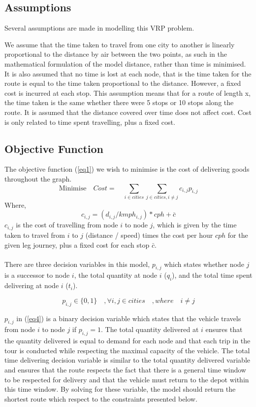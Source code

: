 \documentclass[a4paper,11pt]{article}
\begin{document}
\subsection{Assumptions}
Several assumptions are made in modelling this VRP problem.

We assume that the time taken to travel from one city to another is linearly proportional to the distance by air between the two points, as such in the mathematical formulation of the model distance, rather than time is minimised. It is also assumed that no time is lost at each node, that is the time taken for the route is equal to the time taken proportional to the distance. However, a fixed cost is incurred at each stop. This assumption means that for a route of length x, the time taken is the same whether there were 5 stops or 10 stops along the route. It is assumed that the distance covered over time does not affect cost. Cost is only related to time spent travelling, plus a fixed cost.


\subsection{Objective Function}

The objective function (\ref{eq1}) we wish to minimise is the cost of delivering goods throughout the graph.
\begin{equation}\label{eq1}
\textrm{Minimise}\quad  Cost = \quad \sum\limits_{i \in cities} \sum\limits_{j \in cities, i \neq j} c_{i,j}p_{i,j}
\end{equation}
Where, $$c_{i,j} = (d_{i,j}/kmph_{i,j})*cph + \bar{c}$$
$c_{i,j}$ is the cost of travelling from node $i$ to node $j$, which is given by the time taken to travel from $i$ to $j$ (distance / speed) times the cost per hour $cph$ for the given leg journey, plus a fixed cost for each stop $\bar{c}$. 
\\\\
There are three decision variables in this model, $p_{i,j}$ which states whether node $j$ is a successor to node $i$, the total quantity at node $i$ ($q_{i}$), and the total time spent delivering at node $i$ ($t_{i}$).

\begin{equation}\label{eq4}
p_{i,j} \in{\{0,1\}} \quad , \forall i,j \in cities\quad, where \quad i \neq j
\end{equation}

$p_{i,j}$ in (\ref{eq4}) is a binary decision variable which states that the vehicle travels from node $i$ to node $j$ if $p_{i,j}=1$. The total quantity delivered at $i$ ensures that the quantity delivered is equal to demand for each node and that each trip in the tour is conducted while respecting the maximal capacity of the vehicle. The total time delivering decision variable is similar to the total quantity delivered variable and ensures that the route respects the fact that there is a general time window to be respected for delivery and that the vehicle must return to the depot within this time window. By solving for these variable, the model should return the shortest route which respect to the constraints presented below.
\end{document}
